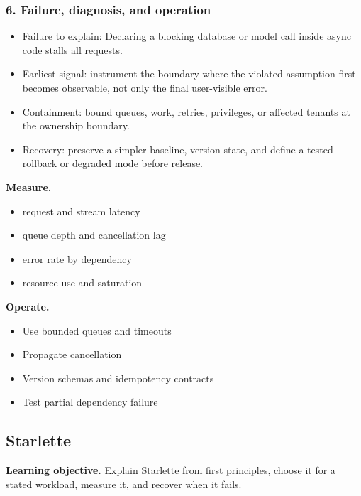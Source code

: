 \subsubsection*{6. Failure, diagnosis, and operation}
\begin{itemize}
\item Failure to explain: Declaring a blocking database or model call inside async code stalls all requests.
\item Earliest signal: instrument the boundary where the violated assumption first becomes observable, not only the final user-visible error.
\item Containment: bound queues, work, retries, privileges, or affected tenants at the ownership boundary.
\item Recovery: preserve a simpler baseline, version state, and define a tested rollback or degraded mode before release.
\end{itemize}
\textbf{Measure.}\begin{itemize}
\item request and stream latency
\item queue depth and cancellation lag
\item error rate by dependency
\item resource use and saturation
\end{itemize}
\textbf{Operate.}\begin{itemize}
\item Use bounded queues and timeouts
\item Propagate cancellation
\item Version schemas and idempotency contracts
\item Test partial dependency failure
\end{itemize}
\subsection{Starlette}
\textbf{Learning objective.} Explain Starlette from first principles, choose it for a stated workload, measure it, and recover when it fails.
